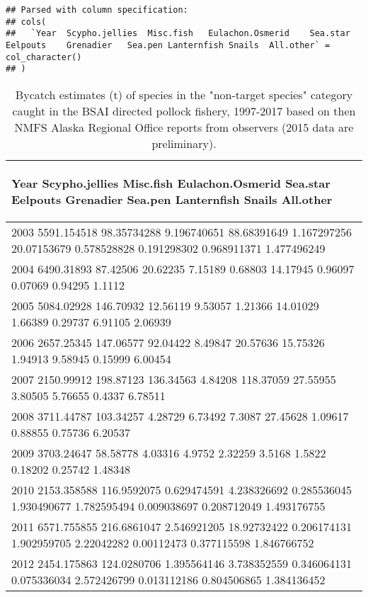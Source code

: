 \documentclass[]{article}
\begin{document}
\begin{verbatim}
## Parsed with column specification:
## cols(
##   `Year  Scypho.jellies  Misc.fish   Eulachon.Osmerid    Sea.star    Eelpouts    Grenadier   Sea.pen Lanternfish Snails  All.other` = col_character()
## )
\end{verbatim}

\begin{table}[ht]
\centering
\caption{Bycatch estimates (t) of species in the "non-target species" category caught in the BSAI directed pollock fishery, 1997-2017 based on then NMFS Alaska Regional Office reports from observers (2015 data are preliminary). } 
\label{tab:byc_nontarg}
\begin{tabular}{l}
  \hline
\begin{sideways} Year   Scypho.jellies  Misc.fish   Eulachon.Osmerid    Sea.star    Eelpouts    Grenadier   Sea.pen Lanternfish Snails  All.other \end{sideways} \\ 
  \hline
2003    5591.154518 98.35734288 9.196740651 88.68391649 1.167297256 20.07153679 0.578528828 0.191298302 0.968911371 1.477496249 \\ 
  2004  6490.31893  87.42506    20.62235    7.15189 0.68803 14.17945    0.96097 0.07069 0.94295 1.1112 \\ 
  2005  5084.02928  146.70932   12.56119    9.53057 1.21366 14.01029    1.66389 0.29737 6.91105 2.06939 \\ 
  2006  2657.25345  147.06577   92.04422    8.49847 20.57636    15.75326    1.94913 9.58945 0.15999 6.00454 \\ 
  2007  2150.99912  198.87123   136.34563   4.84208 118.37059   27.55955    3.80505 5.76655 0.4337  6.78511 \\ 
  2008  3711.44787  103.34257   4.28729 6.73492 7.3087  27.45628    1.09617 0.88855 0.75736 6.20537 \\ 
  2009  3703.24647  58.58778    4.03316 4.9752  2.32259 3.5168  1.5822  0.18202 0.25742 1.48348 \\ 
  2010  2153.358588 116.9592075 0.629474591 4.238326692 0.285536045 1.930490677 1.782595494 0.009038697 0.208712049 1.493176755 \\ 
  2011  6571.755855 216.6861047 2.546921205 18.92732422 0.206174131 1.902959705 2.22042282  0.00112473  0.377115598 1.846766752 \\ 
  2012  2454.175863 124.0280706 1.395564146 3.738352559 0.346064131 0.075336034 2.572426799 0.013112186 0.804506865 1.384136452 \\ 

\end{tabular}
\end{table}
\end{document}
